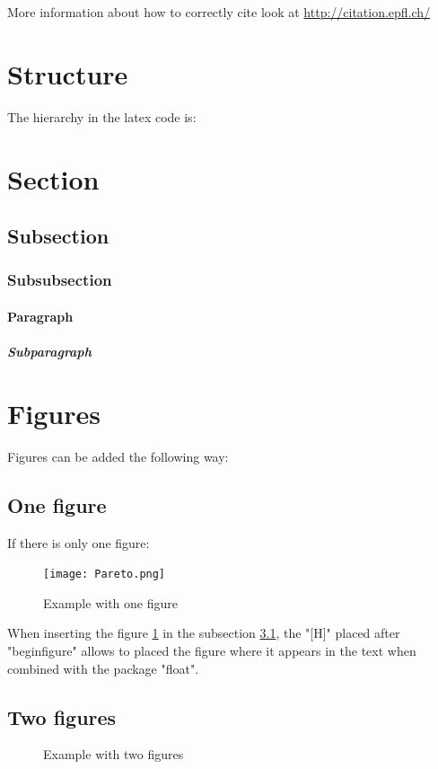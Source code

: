 \documentclass[a4paper,12pt]{article}
\begin{document}
More information about how to correctly cite look at \url{http://citation.epfl.ch/}

\section{Structure}
The hierarchy in the latex code is:
\section{Section}
\subsection{Subsection}
\subsubsection{Subsubsection}
\paragraph{Paragraph}
\subparagraph{Subparagraph}

\section{Figures}
Figures can be added the following way:
\subsection{One figure}
\label{subsect_1figure}
If there is only one figure:
\begin{figure}[H]
 \begin{center}
  \texttt{[image: Pareto.png]}
  \caption{Example with one figure}
  \label{fig_onefig}
 \end{center}
\end{figure}
When inserting the figure \ref{fig_onefig} in the subsection \ref{subsect_1figure}, the "[H]" placed after "begin{figure}" allows to placed the figure where it appears in the text when combined with the package "float".

\subsection{Two figures}
\begin{figure}[H]
  \begin{center}
  \caption{Example with two figures}
    \label{fig_2fig}
  \end{center}
\end{figure}
\end{document}
